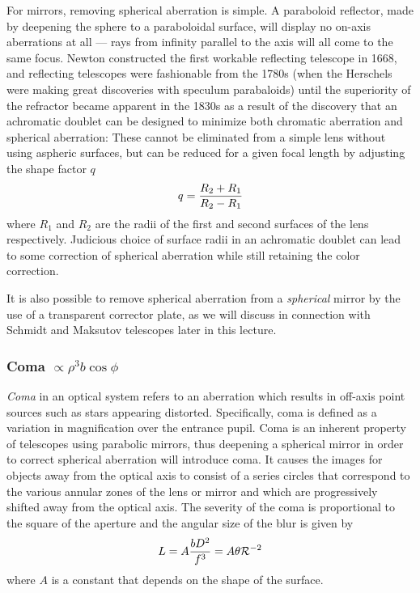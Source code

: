 \documentclass{article}
\def\cl#1{{\cal #1}}               %
\begin{document}
For mirrors, removing spherical aberration is simple. A paraboloid reflector, 
made by deepening the sphere to a paraboloidal surface, 
will display no on-axis aberrations at all --- rays from infinity parallel to 
the axis will all come to the same focus. Newton constructed the first 
workable reflecting telescope in 1668, and reflecting
telescopes were fashionable from the 1780s (when the Herschels were making great
discoveries with speculum parabaloids) until the superiority of the refractor became
apparent in the 1830s as a result of the discovery that an achromatic doublet can be 
designed to minimize both chromatic aberration and spherical aberration:  
These cannot be
eliminated from a simple lens without using aspheric surfaces, but can be
reduced for a given focal length by adjusting the shape factor $q$
\[
q={R_2+R_1\over R_2-R_1}
\]
where $R_1$ and $R_2$ are the radii of the first and second surfaces 
of the lens respectively. Judicious choice of surface radii in an 
achromatic doublet can lead to some correction of spherical aberration while
still retaining the color correction. 

It is also possible to remove spherical aberration from a {\it spherical} mirror by 
the use of a transparent corrector plate, as we will discuss in connection with
Schmidt and Maksutov telescopes later in this lecture.


\subsubsection{Coma $\propto \rho^3b\cos\phi$}

{\it Coma} in an optical system refers to an aberration which results
in off-axis point sources such as stars appearing distorted. Specifically, 
coma is defined as a variation in magnification over the entrance pupil. 
Coma is an inherent property of telescopes using parabolic mirrors, thus
deepening a spherical mirror in order to correct spherical aberration will
introduce coma. It causes the images for objects away from the optical axis
to consist of a series circles that correspond to the various annular 
zones of the lens or mirror and which are progressively shifted away from 
the optical axis. The severity of the coma is proportional to the square of
the aperture and the angular size of the blur is given by
\[ 
L=A{bD^2\over f^3}=A\theta\cl{R}^{-2}
\]
where $A$ is a constant that depends on the shape of the surface.
\end{document}
